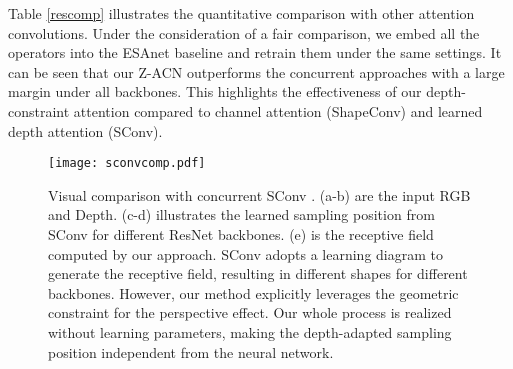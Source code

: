 \documentclass[lettersize,journal]{IEEEtran}
\begin{document}
Table \ref{rescomp} illustrates the quantitative comparison with other attention convolutions. Under the consideration of a fair comparison, we embed all the operators into the ESAnet baseline and retrain them under the same settings. It can be seen that our Z-ACN outperforms the concurrent approaches with a large margin under all backbones. This highlights the effectiveness of our depth-constraint attention compared to channel attention (ShapeConv) and learned depth attention (SConv).



\begin{figure*}
\centering
\texttt{[image: sconvcomp.pdf]}
\caption{Visual comparison with concurrent SConv \cite{chen2021spatial}. (a-b) are the input RGB and Depth. (c-d) illustrates the learned sampling position from SConv for different ResNet backbones. (e) is the receptive field computed by our approach. SConv adopts a learning diagram to generate the receptive field, resulting in different shapes for different backbones. However, our method explicitly leverages the geometric constraint for the perspective effect. Our whole process is realized without learning parameters, making the depth-adapted sampling position independent from the neural network.}
\label{fig:sconvcomp}
\end{figure*}
\end{document}
